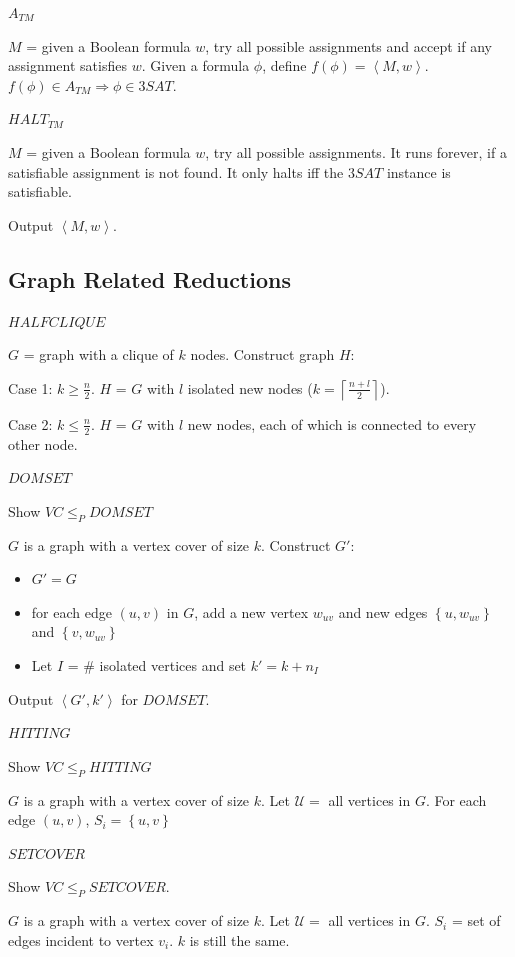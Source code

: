 \documentclass[10pt,landscape,a4paper]{article}
\newcommand{\set}[1]{\left \{ #1 \right \}}
\newcommand{\ceil}[1]{\left \lceil #1 \right \rceil}
\newcommand{\encoding}[1]{\left \langle #1 \right \rangle}
\begin{document}
\begin{multicols*}{3}
\underline{$A_{TM}$}

$M$ = given a Boolean formula $w$, try all possible assignments and accept if any assignment satisfies $w$. Given a formula $\phi$, define $f(\phi) = \encoding{M, w}$. $f(\phi) \in A_{TM} \Rightarrow \phi \in 3SAT$.

\underline{$HALT_{TM}$}

$M$ = given a Boolean formula $w$, try all possible assignments. It runs forever, if a satisfiable assignment is not found. It only halts iff the $3SAT$ instance is satisfiable.

Output $\encoding{M, w}$.

\subsection{Graph Related Reductions}

\underline{$HALFCLIQUE$}

$G$ = graph with a clique of $k$ nodes. Construct graph $H$:

Case 1: $k \geq \frac{n}{2}$. $H$ = $G$ with $l$ isolated new nodes ($k = \ceil{\frac{n + l}{2}}$).

Case 2: $k \leq \frac{n}{2}$. $H$ = $G$ with $l$ new nodes, each of which is connected to every other node.

\underline{$DOMSET$}

Show $VC \leq_P DOMSET$

$G$ is a graph with a vertex cover of size $k$. Construct $G'$:

\begin{itemize}
    \item $G' = G$
    \item for each edge $(u, v)$ in $G$, add a new vertex $w_{uv}$ and new edges $\set{u, w_{uv}}$ and $\set{v, w_{uv}}$
    \item Let $I$ = \# isolated vertices and set $k' = k + n_I$
\end{itemize}

Output $\encoding{G', k'}$ for $DOMSET$.

\underline{$HITTING$}

Show $VC \leq_P HITTING$

$G$ is a graph with a vertex cover of size $k$. Let $\mathcal{U} =$ all vertices in $G$. For each edge $(u, v)$, $S_i = \set{u, v}$

\underline{$SETCOVER$}

Show $VC \leq_P SETCOVER$.

$G$ is a graph with a vertex cover of size $k$. Let $\mathcal{U} =$ all vertices in $G$. $S_i$ = set of edges incident to vertex $v_i$. $k$ is still the same.


\end{multicols*}
\end{document}
